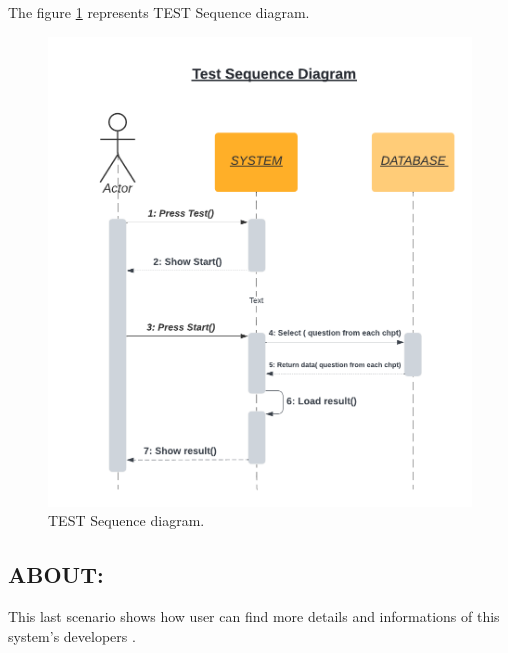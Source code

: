 \newpage
The figure \ref{fig:TEST DS} represents TEST Sequence diagram.
\begin{figure}[ht]
	\centering
	\label{}\includegraphics[scale=0.7]{img/Test Sequence diagram.pdf}                
	\caption{TEST Sequence diagram.} 
	\label{fig:TEST DS}
\end{figure} 



\subsection{ABOUT:}
This last scenario shows how user can find more details and informations of this system's developers .
\newpage

